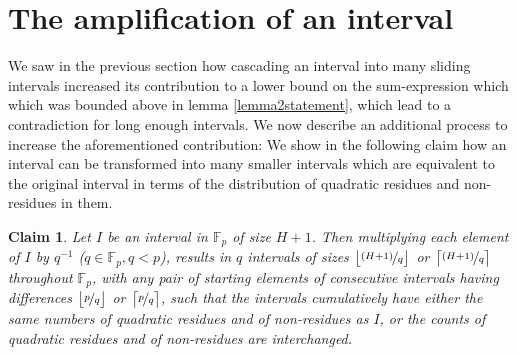 \documentclass{report}
\newtheorem*{claim*}{Claim}
\begin{document}
\section{The amplification of an interval}
We saw in the previous section how cascading an interval into many sliding intervals increased its contribution to a lower bound on the sum-expression which which was bounded above in lemma \ref{lemma2statement}, which lead to a contradiction for long enough intervals. We now describe an additional process to increase the aforementioned contribution: We show in the following claim how an interval can be transformed into many smaller intervals which are equivalent to the original interval in terms of the distribution of quadratic residues and non-residues in them.

\begin{claim*}
Let $I$ be an interval in $\mathbb{F}_p$ of size $H+1$. Then multiplying each element of $I$ by $q^{-1}$ ($q\in\mathbb{F}_p, q < p$), results in $q$ intervals of sizes $\big \lfloor \nicefrac{(H+1)}{q}\big\rfloor$ or $\big \lceil \nicefrac{(H+1)}{q}\big\rceil$ throughout $\mathbb{F}_p$, with any pair of starting elements of consecutive intervals having differences $\big \lfloor\nicefrac{p}{q}\big\rfloor$ or $\big \lceil\nicefrac{p}{q}\big\rceil$, such that the intervals cumulatively have either the same numbers of quadratic residues and of non-residues as $I$, or the counts of quadratic residues and of non-residues are interchanged.
\end{claim*}
\end{document}
